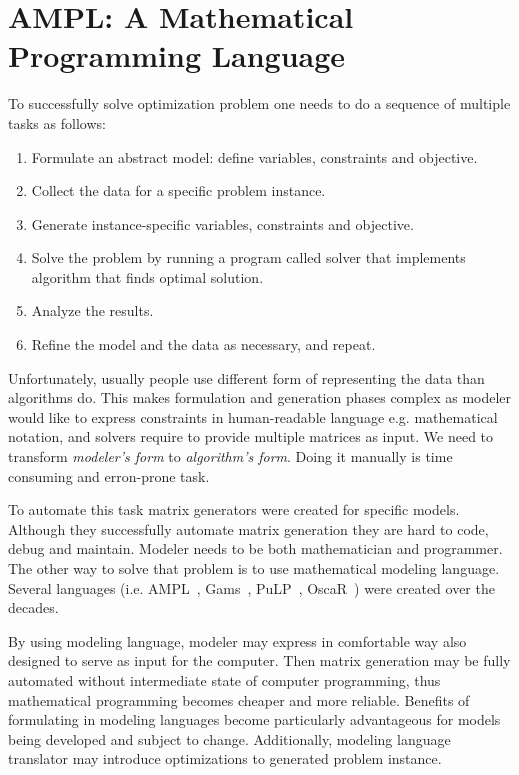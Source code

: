 \section{AMPL: A Mathematical Programming Language}
\label{sec:ampl:ampl}

To successfully solve optimization problem one needs to do a sequence of multiple tasks as follows:

\begin{enumerate}
  \item Formulate an abstract model: define variables, constraints and objective.
  \item Collect the data for a specific problem instance.
  \item Generate instance-specific variables, constraints and objective.
  \item Solve the problem by running a program called solver that implements algorithm that finds optimal solution.
  \item Analyze the results.
  \item Refine the model and the data as necessary, and repeat.
\end{enumerate}

Unfortunately, usually people use different form of representing the data than algorithms do. This makes formulation and generation phases complex as modeler would like to express constraints in human-readable language e.g. mathematical notation, and solvers require to provide multiple matrices as input. We need to transform \emph{modeler's form} to \emph{algorithm's form}. Doing it manually is time consuming and erron-prone task.

To automate this task matrix generators were created for specific models. Although they successfully automate matrix generation they are hard to code, debug and maintain. Modeler needs to be both mathematician and programmer. The other way to solve that problem is to use mathematical modeling language. Several languages (i.e. AMPL~\cite{Fourer2002}, Gams~\cite{Gams}, PuLP~\cite{PuLP}, OscaR~\cite{OscaR}) were created over the decades. 

By using modeling language, modeler may express in comfortable way also designed to serve as input for the computer. Then matrix generation may be fully automated without intermediate state of computer programming, thus mathematical programming becomes cheaper and more reliable. Benefits of formulating in modeling languages become particularly advantageous for models being developed and subject to change. Additionally, modeling language translator may introduce optimizations to generated problem instance.

